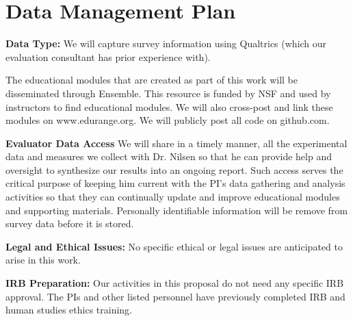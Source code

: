 \section{Data Management Plan}

{\bf Data Type:} 
We will capture survey information using Qualtrics (which our evaluation 
consultant has prior experience with).   


The educational modules that are created as part of this work will be
disseminated through Ensemble.  This resource is funded by NSF and used by instructors 
to find educational modules.
We will also cross-post and link these modules on www.edurange.org.
We will publicly post all code on github.com.

{\bf Evaluator Data Access} We will share in a timely manner, all the 
experimental data and measures we collect with Dr. Nilsen
so that he can provide help and oversight to synthesize our results into an 
ongoing report.  Such access serves the critical purpose of keeping him
current with the PI's data gathering and analysis activities so that they can 
continually update and improve educational modules and supporting materials.
Personally identifiable information will be remove from survey data before it is stored.

{\bf Legal and Ethical Issues:} No specific ethical or legal issues 
are anticipated to arise in this work.   

{\bf IRB Preparation:} Our activities in this proposal do not need any
specific IRB approval.   %
The PIs and other listed personnel have previously completed 
IRB and human studies ethics training.

